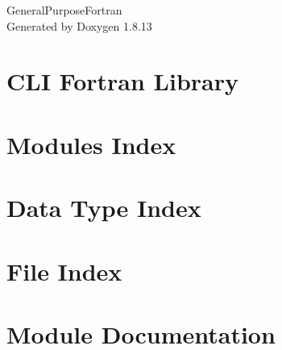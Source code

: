 \documentclass[twoside]{book}
\newcommand{\+}{\discretionary{\mbox{\scriptsize$\hookleftarrow$}}{}{}}
\newcommand{\clearemptydoublepage}{%
  \newpage{\pagestyle{empty}\cleardoublepage}%
}
\begin{document}
\hypersetup{pageanchor=false,
             bookmarksnumbered=true,
             pdfencoding=unicode
            }
\begin{titlepage}
\vspace*{7cm}
\begin{center}%
{\Large General\+Purpose\+Fortran }\\
\vspace*{1cm}
{\large Generated by Doxygen 1.8.13}\\
\end{center}
\end{titlepage}
\clearemptydoublepage
{}
\tableofcontents
\clearemptydoublepage
{}
\hypersetup{pageanchor=true}

\chapter{C\+LI Fortran Library}
\label{index}\hypertarget{index}{}
\chapter{Modules Index}

\chapter{Data Type Index}

\chapter{File Index}

\chapter{Module Documentation}














































\end{document}

